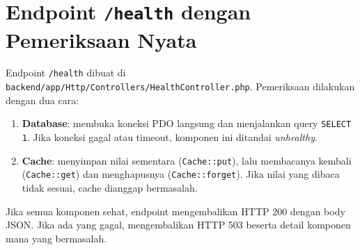 \documentclass[a4paper,oneside,11pt]{book}
\begin{document}
\section{Endpoint \texttt{/health} dengan Pemeriksaan Nyata}

Endpoint \texttt{/health} dibuat di \texttt{backend/app/Http/Controllers/HealthController.php}.
Pemeriksaan dilakukan dengan dua cara:

\begin{enumerate}
  \item \textbf{Database}: membuka koneksi PDO langsung dan menjalankan query \texttt{SELECT 1}.
        Jika koneksi gagal atau timeout, komponen ini ditandai \textit{unhealthy}.
  \item \textbf{Cache}: menyimpan nilai sementara (\texttt{Cache::put}), lalu membacanya kembali
        (\texttt{Cache::get}) dan menghapusnya (\texttt{Cache::forget}). Jika nilai yang dibaca
        tidak sesuai, cache dianggap bermasalah.
\end{enumerate}

Jika semua komponen sehat, endpoint mengembalikan HTTP 200 dengan body JSON. Jika ada yang
gagal, mengembalikan HTTP 503 beserta detail komponen mana yang bermasalah.
\end{document}
